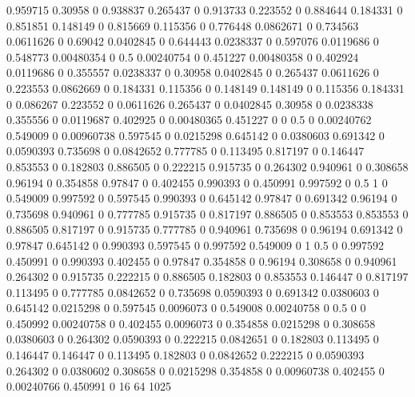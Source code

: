 0.959715 0.30958 0
0.938837 0.265437 0
0.913733 0.223552 0
0.884644 0.184331 0
0.851851 0.148149 0
0.815669 0.115356 0
0.776448 0.0862671 0
0.734563 0.0611626 0
0.69042 0.0402845 0
0.644443 0.0238337 0
0.597076 0.0119686 0
0.548773 0.00480354 0
0.5 0.00240754 0
0.451227 0.00480358 0
0.402924 0.0119686 0
0.355557 0.0238337 0
0.30958 0.0402845 0
0.265437 0.0611626 0
0.223553 0.0862669 0
0.184331 0.115356 0
0.148149 0.148149 0
0.115356 0.184331 0
0.086267 0.223552 0
0.0611626 0.265437 0
0.0402845 0.30958 0
0.0238338 0.355556 0
0.0119687 0.402925 0
0.00480365 0.451227 0
0 0.5 0
0.00240762 0.549009 0
0.00960738 0.597545 0
0.0215298 0.645142 0
0.0380603 0.691342 0
0.0590393 0.735698 0
0.0842652 0.777785 0
0.113495 0.817197 0
0.146447 0.853553 0
0.182803 0.886505 0
0.222215 0.915735 0
0.264302 0.940961 0
0.308658 0.96194 0
0.354858 0.97847 0
0.402455 0.990393 0
0.450991 0.997592 0
0.5 1 0
0.549009 0.997592 0
0.597545 0.990393 0
0.645142 0.97847 0
0.691342 0.96194 0
0.735698 0.940961 0
0.777785 0.915735 0
0.817197 0.886505 0
0.853553 0.853553 0
0.886505 0.817197 0
0.915735 0.777785 0
0.940961 0.735698 0
0.96194 0.691342 0
0.97847 0.645142 0
0.990393 0.597545 0
0.997592 0.549009 0
1 0.5 0
0.997592 0.450991 0
0.990393 0.402455 0
0.97847 0.354858 0
0.96194 0.308658 0
0.940961 0.264302 0
0.915735 0.222215 0
0.886505 0.182803 0
0.853553 0.146447 0
0.817197 0.113495 0
0.777785 0.0842652 0
0.735698 0.0590393 0
0.691342 0.0380603 0
0.645142 0.0215298 0
0.597545 0.0096073 0
0.549008 0.00240758 0
0.5 0 0
0.450992 0.00240758 0
0.402455 0.0096073 0
0.354858 0.0215298 0
0.308658 0.0380603 0
0.264302 0.0590393 0
0.222215 0.0842651 0
0.182803 0.113495 0
0.146447 0.146447 0
0.113495 0.182803 0
0.0842652 0.222215 0
0.0590393 0.264302 0
0.0380602 0.308658 0
0.0215298 0.354858 0
0.00960738 0.402455 0
0.00240766 0.450991 0
16 64 1025
